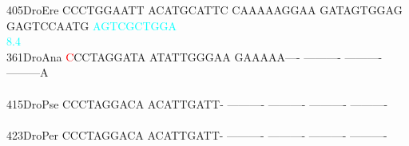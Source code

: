 \documentclass[11pt,twoside,reqno,a4paper]{article}
\begin{document}
{405\hspace*{1\charwidth}DroEre	CCCTGGAATT	ACATGCATTC	CAAAAAGGAA	GATAGTGGAG	GAGTCCAATG	\textcolor{cyan}{A}\textcolor{cyan}{G}\textcolor{cyan}{T}\textcolor{cyan}{C}\textcolor{cyan}{G}\textcolor{cyan}{C}\textcolor{cyan}{T}\textcolor{cyan}{G}\textcolor{cyan}{G}\textcolor{cyan}{A}	\\
\hspace*{4\charwidth}\hspace*{7\charwidth}\hspace*{1\charwidth}\hspace*{1\charwidth}\hspace*{1\charwidth}\hspace*{1\charwidth}\hspace*{1\charwidth}\hspace*{50\charwidth}\textcolor{cyan}{8.4}\hspace*{1\charwidth}\\
361\hspace*{1\charwidth}DroAna	\textcolor{red}{C}CCTAGGATA	ATATTGGGAA	GAAAAA----	----------	----------	---------A	\\
\hspace*{4\charwidth}\hspace*{7\charwidth}\hspace*{1\charwidth}\hspace*{1\charwidth}\hspace*{1\charwidth}\hspace*{1\charwidth}\hspace*{1\charwidth}\hspace*{1\charwidth}\\
415\hspace*{1\charwidth}DroPse	CCCTAGGACA	ACATTGATT-	----------	----------	----------	----------	\\
\hspace*{4\charwidth}\hspace*{7\charwidth}\hspace*{1\charwidth}\hspace*{1\charwidth}\hspace*{1\charwidth}\hspace*{1\charwidth}\hspace*{1\charwidth}\hspace*{1\charwidth}\\
423\hspace*{1\charwidth}DroPer	CCCTAGGACA	ACATTGATT-	----------	----------	----------	----------	\\
\hspace*{4\charwidth}\hspace*{7\charwidth}\hspace*{1\charwidth}\hspace*{1\charwidth}\hspace*{1\charwidth}\hspace*{1\charwidth}\hspace*{1\charwidth}\hspace*{1\charwidth}\\
}
\end{document}
